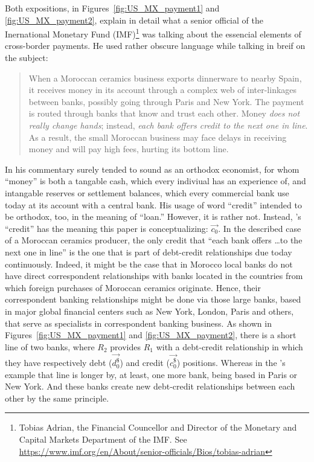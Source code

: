 Both expositions, in Figures~\ref{fig:US_MX_payment1} and \ref{fig:US_MX_payment2}, explain in detail what a senior official of the Inernational Monetary Fund (IMF)\footnote{Tobias Adrian, the Financial Councellor and Director of the Monetary and Capital Markets Department of the IMF. See \url{https://www.imf.org/en/About/senior-officials/Bios/tobias-adrian}} was talking about the essencial elements of cross-border payments. He used rather obscure language while talking in breif on the subject:

\begin{quote}
When a Moroccan ceramics business exports dinnerware to nearby Spain, it receives
money in its account through a complex web of inter-linkages between banks, possibly
going through Paris and New York. The payment is routed through banks
that know and trust each other. Money \textit{does not really change hands}; instead, \textit{each
bank offers credit to the next one in line}. As a result, the small Moroccan business
may face delays in receiving money and will pay high fees, hurting its bottom line.
\citep[emphasis added]{adrian2023}
\end{quote}

In his commentary \citeauthor{adrian2023} surely tended to sound as an orthodox economist, for whom ``money'' is both a tangable cash, which every indiviual has an experience of, and intangable reserves or settlement balances, which every commercial bank use today at its account with a central bank. His usage of word ``credit'' intended to be orthodox, too, in the meaning of ``loan.'' However, it is rather not. Instead, \citeauthor{adrian2023}'s ``credit'' has the meaning this paper is conceptualizing: $\overrightarrow{c_0}$. In the described case of a Moroccan ceramics producer, the only credit that ``each bank offers \dots to the next one in line'' is the one that is part of debt-credit relationships due today continuously. Indeed, it might be the case that in Morocco local banks do not have direct correspondent relationships with banks located in the countries from which foreign purchases of Moroccan ceramics originate. Hence, their correspondent banking relationships might be done via those large banks, based in major global financial centers such as New York, London, Paris and others, that serve as specialists in correspondent banking business. As shown in Figures~\ref{fig:US_MX_payment1} and \ref{fig:US_MX_payment2}, there is a short line of two banks, where $R_2$ provides $R_1$ with a debt-credit relationship in which they have respectively debt ($\overrightarrow{d^{\$}_0}$) and credit ($\overrightarrow{c^{\$}_0}$) positions. Whereas in the \citeauthor{adrian2023}'s example that line is longer by, at least, one more bank, being based in Paris or New York. And these banks create new debt-credit relationships between each other by the same principle.

